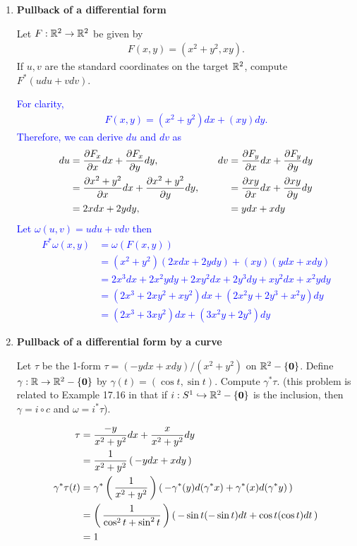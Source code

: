 \documentclass[12pt,a4paper]{report}
\newcommand{\BLUE}[1]{\textcolor{blue}{#1}}
\begin{document}
\begin{enumerate}[label=19.\arabic*]
\item \textbf{Pullback of a differential form}

Let $F: \mathbb{R}^2 \to \mathbb{R}^2$ be given by 
\begin{align*}
	F(x,y) = (x^2+y^2,xy).
\end{align*}If $u,v$ are the standard coordinates on the target $\mathbb{R}^2$, compute $F^*(udu+vdv)$.

\BLUE{For clarity, 
\begin{align*}
	F(x,y) = (x^2+y^2)dx + (xy)dy.
\end{align*}Therefore, we can derive $du$ and $dv$ as
\begin{alignat*}{2}
	du &= \frac{\partial F_x}{\partial x}dx + \frac{\partial F_x}{\partial y}dy, & \quad 
	dv &= \frac{\partial F_y}{\partial x}dx + \frac{\partial F_y}{\partial y}dy\\
	&= \frac{\partial x^2+y^2}{\partial x}dx + \frac{\partial x^2+y^2}{\partial y}dy, & \quad
	&= \frac{\partial xy}{\partial x}dx + \frac{\partial xy}{\partial y}dy \\
	&= 2xdx+2ydy, & \quad
	&= ydx+xdy
\end{alignat*}Let $\omega(u,v) = udu+vdv$ then
\begin{align*}
	F^*\omega(x,y) &= \omega(F(x,y)) \\
	&= (x^2+y^2)(2xdx+2ydy)+(xy)(ydx+xdy) \\
	&= 2x^3dx+2x^2ydy+2xy^2dx+2y^3dy+xy^2dx+x^2ydy \\
	&= (2x^3+2xy^2+xy^2)dx+(2x^2y+2y^3+x^2y)dy \\
	&= (2x^3+3xy^2)dx+(3x^2y+2y^3)dy
\end{align*}
}

\item \textbf{Pullback of a differential form by a curve}

Let $\tau$ be the 1-form $\tau = (-ydx+xdy)/(x^2+y^2)$ on $\mathbb{R}^2-\{\textbf{0}\}$.  Define $\gamma: \mathbb{R} \to \mathbb{R}^2 - \{\textbf{0}\}$ by $\gamma(t)=(\cos t,\sin t)$.  Compute $\gamma^*\tau$.  (this problem is related to Example 17.16 in that if $i: S^1\hookrightarrow \mathbb{R}^2-\{\textbf{0}\}$ is the inclusion, then $\gamma= i \circ c$ and $\omega=i^*\tau$).

\BLUE{\begin{align*}
	\tau &= \frac{-y}{x^2+y^2}dx+\frac{x}{x^2+y^2} dy \\
		&= \frac{1}{x^2+y^2}\left (\, -ydx+xdy \,\right ) \\
	\gamma^*\tau(t) &=\gamma^*\left (\, \frac{1}{x^2+y^2} \,\right )\left (\, -\gamma^*(y)d(\gamma^*x)+\gamma^*(x)d(\gamma^*y) \,\right ) \\
	&= \left (\, \frac{1}{\cos^2t+\sin^2 t} \,\right )\left (\, -\sin t(-\sin t)dt+\cos t(\cos t)dt \,\right ) \\
	 &= 1
\end{align*}
}


\end{enumerate}
\end{document}
